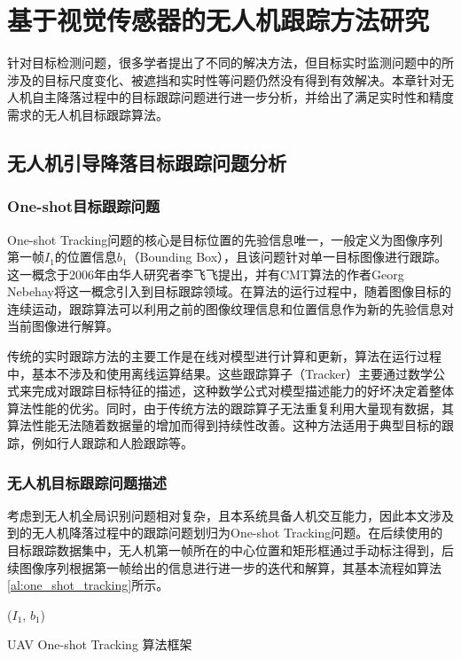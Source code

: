 \chapter{基于视觉传感器的无人机跟踪方法研究}

针对目标检测问题，很多学者提出了不同的解决方法，但目标实时监测问题中的所涉及的目标尺度变化、被遮挡和实时性等问题仍然没有得到有效解决。本章针对无人机自主降落过程中的目标跟踪问题进行进一步分析，并给出了满足实时性和精度需求的无人机目标跟踪算法。

\section{无人机引导降落目标跟踪问题分析}
\subsection{One-shot目标跟踪问题}
One-shot Tracking问题的核心是目标位置的先验信息唯一，一般定义为图像序列第一帧$I_1$的位置信息$b_1$（Bounding Box），且该问题针对单一目标图像进行跟踪。这一概念于2006年由华人研究者李飞飞提出\cite{fei2006one}，并有CMT算法\cite{Nebehay2016}的作者Georg Nebehay将这一概念引入到目标跟踪领域。在算法的运行过程中，随着图像目标的连续运动，跟踪算法可以利用之前的图像纹理信息和位置信息作为新的先验信息对当前图像进行解算。

传统的实时跟踪方法的主要工作是在线对模型进行计算和更新，算法在运行过程中，基本不涉及和使用离线运算结果。这些跟踪算子（Tracker）主要通过数学公式来完成对跟踪目标特征的描述，这种数学公式对模型描述能力的好坏决定着整体算法性能的优劣。同时，由于传统方法的跟踪算子无法重复利用大量现有数据，其算法性能无法随着数据量的增加而得到持续性改善。这种方法适用于典型目标的跟踪，例如行人跟踪和人脸跟踪等。

\subsection{无人机目标跟踪问题描述}
考虑到无人机全局识别问题相对复杂，且本系统具备人机交互能力，因此本文涉及到的无人机降落过程中的跟踪问题划归为One-shot Tracking问题。在后续使用的目标跟踪数据集中，无人机第一帧所在的中心位置和矩形框通过手动标注得到，后续图像序列根据第一帧给出的信息进行进一步的迭代和解算，其基本流程如算法\ref{al:one_shot_tracking}所示。
\begin{algorithm2e}[h]
	\SetAlgoLined
	\BlankLine
	\Initialization($I_1$, $b_1$)\;
	\caption{UAV One-shot Tracking 算法框架}
	\label{al:one_shot_tracking}
\end{algorithm2e}

